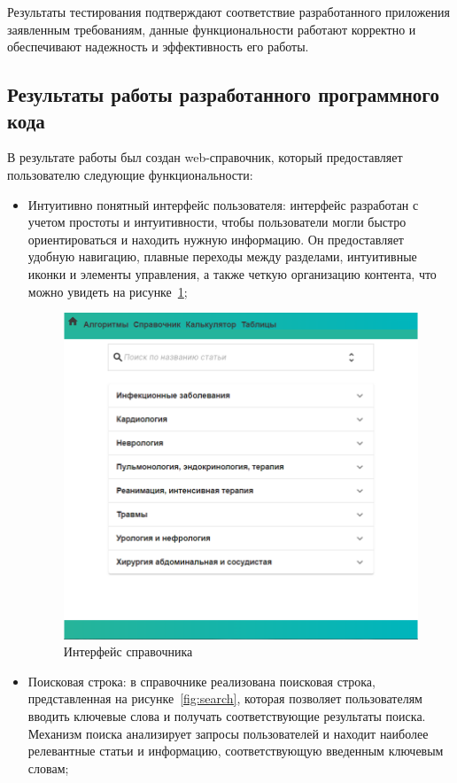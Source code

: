 Результаты тестирования подтверждают соответствие разработанного приложения заявленным требованиям, данные функциональности работают корректно и обеспечивают надежность и эффективность его работы.

\subsection{Результаты работы разработанного программного кода}

В результате работы был создан web-справочник, который предоставляет пользователю следующие функциональности:

\begin{itemize}
    \item Интуитивно понятный интерфейс пользователя: интерфейс разработан с учетом простоты и интуитивности, чтобы пользователи могли быстро ориентироваться и находить нужную информацию. Он предоставляет удобную навигацию, плавные переходы между разделами, интуитивные иконки и элементы управления, а также четкую организацию контента, что можно увидеть на рисунке~\ref{fig:main-page};

\begin{figure}
  \includegraphics[scale=0.6]{styles/diploma/inc/ГлСтраница.png}
  \caption{Интерфейс справочника}
  \label{fig:main-page}
\end{figure}

    \item Поисковая строка: в справочнике реализована поисковая строка, представленная на рисунке~\ref{fig:search}, которая позволяет пользователям вводить ключевые слова и получать соответствующие результаты поиска. Механизм поиска анализирует запросы пользователей и находит наиболее релевантные статьи и информацию, соответствующую введенным ключевым словам;


\end{itemize}
